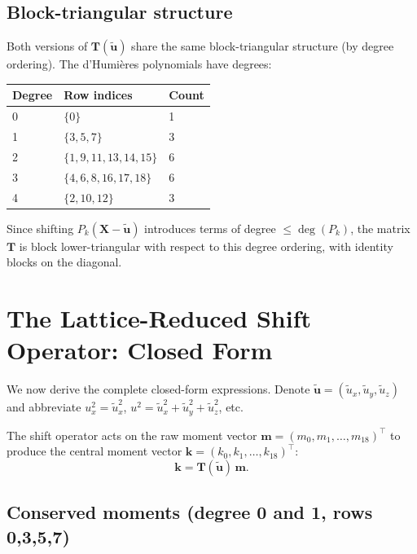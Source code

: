 \documentclass[11pt,a4paper]{article}
\newcommand{\vect}[1]{\bm{#1}}
\newcommand{\mat}[1]{\bm{#1}}
\newcommand{\Tmat}{\mat{T}}
\newcommand{\tu}{\tilde{u}}
\begin{document}
\subsection{Block-triangular structure}

Both versions of $\Tmat(\tilde{\vect{u}})$ share the same block-triangular structure (by degree ordering).
The d'Humi\`eres polynomials have degrees:
\begin{center}
\begin{tabular}{lll}
\toprule
Degree & Row indices & Count \\
\midrule
0 & $\{0\}$ & 1 \\
1 & $\{3,5,7\}$ & 3 \\
2 & $\{1,9,11,13,14,15\}$ & 6 \\
3 & $\{4,6,8,16,17,18\}$ & 6 \\
4 & $\{2,10,12\}$ & 3 \\
\bottomrule
\end{tabular}
\end{center}

Since shifting $P_k(\vect{X} - \tilde{\vect{u}})$ introduces terms of degree $\leq \deg(P_k)$, the matrix $\Tmat$ is block lower-triangular with respect to this degree ordering, with identity blocks on the diagonal.

\section{The Lattice-Reduced Shift Operator: Closed Form}\label{sec:closed-form}

We now derive the complete closed-form expressions.
Denote $\tilde{\vect{u}} = (\tu_x, \tu_y, \tu_z)$ and abbreviate $u_x^2 = \tu_x^2$, $u^2 = \tu_x^2 + \tu_y^2 + \tu_z^2$, etc.

The shift operator acts on the raw moment vector $\vect{m} = (m_0, m_1, \ldots, m_{18})^{\!\top}$ to produce the central moment vector $\vect{k} = (k_0, k_1, \ldots, k_{18})^{\!\top}$:
\begin{equation}
  \vect{k} = \Tmat(\tilde{\vect{u}})\,\vect{m}.
\end{equation}

\subsection{Conserved moments (degree 0 and 1, rows 0,3,5,7)}
\end{document}
